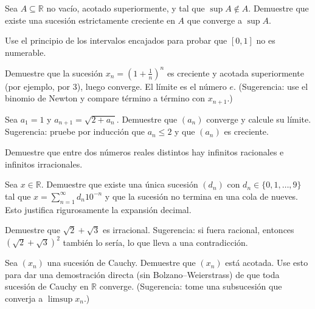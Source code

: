 \begin{exercise}
Sea $A\subseteq\mathbb{R}$ no vacío, acotado superiormente, y tal que $\sup A\notin A$. Demuestre que existe una sucesión estrictamente creciente en $A$ que converge a $\sup A$.
\end{exercise}

\begin{exercise}
Use el principio de los intervalos encajados para probar que $[0,1]$ no es numerable.
\end{exercise}

\begin{exercise}
Demuestre que la sucesión $x_n=(1+\frac{1}{n})^n$ es creciente y acotada superiormente (por ejemplo, por 3), luego converge. El límite es el número $e$. (Sugerencia: use el binomio de Newton y compare término a término con $x_{n+1}$.)
\end{exercise}

\begin{exercise}
Sea $a_1=1$ y $a_{n+1}=\sqrt{2+a_n}$. Demuestre que $(a_n)$ converge y calcule su límite. Sugerencia: pruebe por inducción que $a_n\leq 2$ y que $(a_n)$ es creciente.
\end{exercise}

\begin{exercise}
Demuestre que entre dos números reales distintos hay infinitos racionales e infinitos irracionales.
\end{exercise}

\begin{exercise}
Sea $x\in\mathbb{R}$. Demuestre que existe una única sucesión $(d_n)$ con $d_n\in\{0,1,\dots,9\}$ tal que $x=\sum_{n=1}^{\infty}d_n10^{-n}$ y que la sucesión no termina en una cola de nueves. Esto justifica rigurosamente la expansión decimal.
\end{exercise}

\begin{exercise}
Demuestre que $\sqrt{2}+\sqrt{3}$ es irracional. Sugerencia: si fuera racional, entonces $(\sqrt{2}+\sqrt{3})^2$ también lo sería, lo que lleva a una contradicción.
\end{exercise}

\begin{exercise}
Sea $(x_n)$ una sucesión de Cauchy. Demuestre que $(x_n)$ está acotada. Use esto para dar una demostración directa (sin Bolzano--Weierstrass) de que toda sucesión de Cauchy en $\mathbb{R}$ converge. (Sugerencia: tome una subsucesión que converja a $\limsup x_n$.)
\end{exercise}

